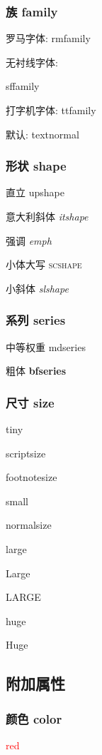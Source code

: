 \documentclass{article}
\begin{document}
	\subsubsection{族 family}
		罗马字体: \textrm{rmfamily}

		无衬线字体: 
		\begin{sffamily} 
			sffamily 
		\end{sffamily}

		打字机字体: {\ttfamily ttfamily}

		默认: \textnormal{textnormal{}}

		\rmfamily
	\subsubsection{形状 shape}
		直立 \upshape upshape

		意大利斜体 \itshape itshape

		强调 \emph{emph}

		小体大写 \scshape scshape

		小斜体 \slshape slshape

	\subsubsection{系列 series}
		中等权重 \mdseries mdseries

		粗体 \textbf{bfseries}
	
	\subsubsection{尺寸 size}
		\tiny tiny

		\scriptsize scriptsize

		\footnotesize footnotesize

		\small small

		\normalsize normalsize

		\large large

		\Large Large

		\LARGE LARGE

		\huge huge

		\Huge Huge
		
	\subsection{附加属性}
	\subsubsection{颜色 color}
		\textcolor{red}{red}
\end{document}
